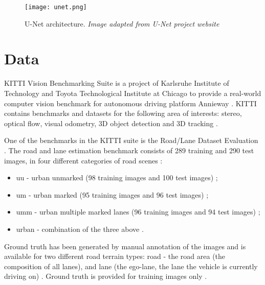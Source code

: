 \documentclass[10pt,twocolumn,letterpaper]{article}
\begin{document}
\begin{figure}[ht]
  \centering
  \texttt{[image: unet.png]}
  \caption{U-Net architecture. \textit{Image adapted from U-Net project website} \cite{UNET_WEBSITE} \cite{UNET}}
  \label{fig:unet}
\end{figure}


\section{Data} \label{sec:data}


KITTI Vision Benchmarking Suite is a project of Karlsruhe Institute of Technology and Toyota Technological Institute at Chicago to provide a real-world computer vision benchmark for autonomous driving platform Annieway \cite{KITTI_FULL} \cite{KITTI_WEBSITE}. KITTI contains benchmarks and datasets for the following area of interests: stereo, optical flow, visual odometry, 3D object detection and 3D tracking \cite{KITTI_WEBSITE}.

One of the benchmarks in the KITTI suite is the Road/Lane Dataset Evaluation \cite{KITTI}. The road and lane estimation benchmark consists of 289 training and 290 test images, in four different categories of road scenes \cite{KITTI}:

\begin{itemize}
 \item uu - urban unmarked (98 training images and 100 test images) \cite{KITTI};
 \item um - urban marked (95 training images and 96 test images) \cite{KITTI};
 \item umm - urban multiple marked lanes (96 training images and 94 test images) \cite{KITTI};
 \item urban - combination of the three above \cite{KITTI}.
\end{itemize}

Ground truth has been generated by manual annotation of the images and is available for two different road terrain types: road - the road area (the composition of all lanes), and lane (the ego-lane, the lane the vehicle is currently driving on) \cite{KITTI} \cite{KITTI_WEBSITE}. Ground truth is provided for training images only \cite{KITTI}. 
\end{document}
